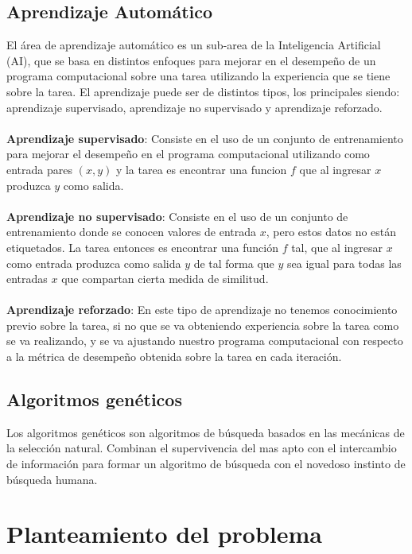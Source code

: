 \subsection{Aprendizaje Automático}

El área de aprendizaje automático es un sub-area de la Inteligencia Artificial (AI), que se basa en distintos enfoques para mejorar en el desempeño de un programa computacional sobre una tarea utilizando la experiencia que se tiene sobre la tarea. El aprendizaje puede ser de distintos tipos, los principales siendo: aprendizaje supervisado, aprendizaje no supervisado y aprendizaje reforzado.
\\
\\
\textbf{Aprendizaje supervisado}: Consiste en el uso de un conjunto de entrenamiento para mejorar el desempeño en el programa computacional utilizando como entrada pares $(x,y)$ y la tarea es encontrar una funcion $f$ que al ingresar $x$ produzca $y$ como salida. 
\\
\\
\textbf{Aprendizaje no supervisado}: Consiste en el uso de un conjunto de entrenamiento donde se conocen valores de entrada $x$, pero estos datos no están etiquetados. La tarea entonces es encontrar una función $f$ tal, que al ingresar $x$ como entrada produzca como salida $y$ de tal forma que $y$ sea igual para todas las entradas $x$ que compartan cierta medida de similitud.
\\
\\
\textbf{Aprendizaje reforzado}: En este tipo de aprendizaje no tenemos conocimiento previo sobre la tarea, si no que se va obteniendo experiencia sobre la tarea como se va realizando, y se va ajustando nuestro programa computacional con respecto a la métrica de desempeño obtenida sobre la tarea en cada iteración.

\subsection{Algoritmos genéticos}

Los algoritmos genéticos son algoritmos de búsqueda basados en las mecánicas de la selección natural. Combinan el supervivencia del mas apto con el intercambio de información para formar un algoritmo de búsqueda con el novedoso instinto de búsqueda humana.  


\section{Planteamiento del problema}

